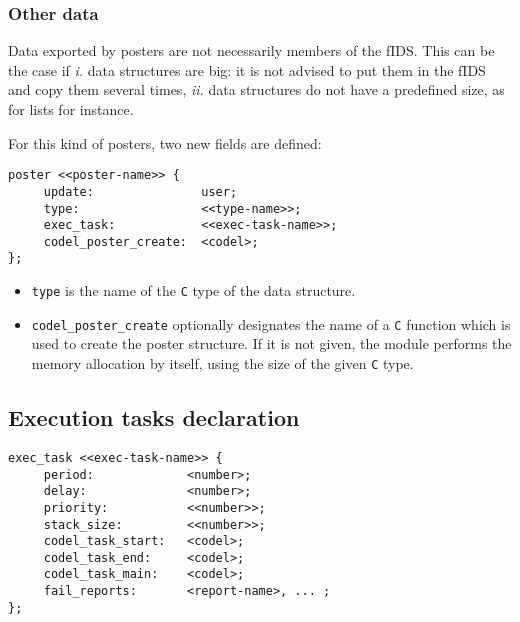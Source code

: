 \subsubsection{Other data}

Data exported by posters  are not necessarily members  of the fIDS.  This
can be the case if {\em i.} data structures are big: it is not advised to
put  them in   the fIDS and   copy them  several times, {\em   ii.}  data
structures do not have a predefined size, as for lists for instance.

For this kind of posters, two new fields are defined:

\begin{center}\begin{cartouche}\small\begin{verbatim}
poster <<poster-name>> {
     update:               user;
     type:                 <<type-name>>;
     exec_task:            <<exec-task-name>>;
     codel_poster_create:  <codel>;
};
\end{verbatim}\end{cartouche}\end{center}

\begin{itemize}
\item {\tt type} is the name of the {\tt C} type of the data structure.
\item {\tt codel\_poster\_create} optionally designates the name of a {\tt C}
function which is   used to create the  poster  structure. If  it is  not
given,  the  module performs the memory  allocation  by itself, using the
size of the  given {\tt C} type.
\end{itemize}


\subsection{Execution tasks declaration}

\begin{center}\begin{cartouche}\small\begin{verbatim}
exec_task <<exec-task-name>> {
     period:             <number>;
     delay:              <number>;
     priority:           <<number>>;
     stack_size:         <<number>>;
     codel_task_start:   <codel>;
     codel_task_end:     <codel>;
     codel_task_main:    <codel>;
     fail_reports:       <report-name>, ... ;
};
\end{verbatim}\end{cartouche}\end{center}

